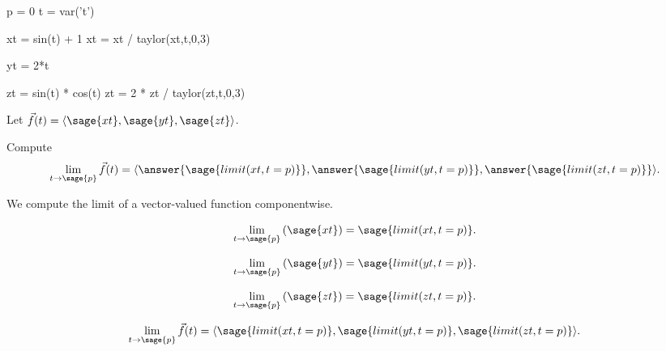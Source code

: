 \documentclass{ximera}
\author{Jim Fowler}
\begin{document}
\makerandom

\begin{sagesilent}
  p = 0
  t = var('t')
  
  xt = sin(t) + 1
  xt = xt / taylor(xt,t,0,3)
  
  yt = 2*t
  
  zt = sin(t) * cos(t)
  zt = 2 * zt / taylor(zt,t,0,3)
\end{sagesilent}

\begin{exercise}

  Let $\vec{f}(t) = \langle \sage{xt}, \sage{yt}, \sage{zt} \rangle$.

  Compute
  \[
    \lim_{t \to \sage{p}} \vec{f}(t) =
    \langle \answer{\sage{limit(xt,t=p)}}, \answer{\sage{limit(yt,t=p)}}, \answer{\sage{limit(zt,t=p)}} \rangle.
  \]
  
  \begin{hint}
    We compute the limit of a vector-valued function componentwise.
  \end{hint}

  \begin{hint}
    \[\lim_{t \to \sage{p}} \left( \sage{xt} \right) = \sage{limit(xt,t=p)}.\]
  \end{hint}

  \begin{hint}
    \[\lim_{t \to \sage{p}} \left( \sage{yt} \right) = \sage{limit(yt,t=p)}.\]
  \end{hint}

  \begin{hint}
    \[\lim_{t \to \sage{p}} \left( \sage{zt} \right) = \sage{limit(zt,t=p)}.\]
  \end{hint}
  
  \begin{hint}
    \[\lim_{t \to \sage{p}} \vec{f}(t) = \langle \sage{limit(xt,t=p)}, \sage{limit(yt,t=p)}, \sage{limit(zt,t=p)} \rangle.\]
  \end{hint}          
  
\end{exercise}
\end{document}
